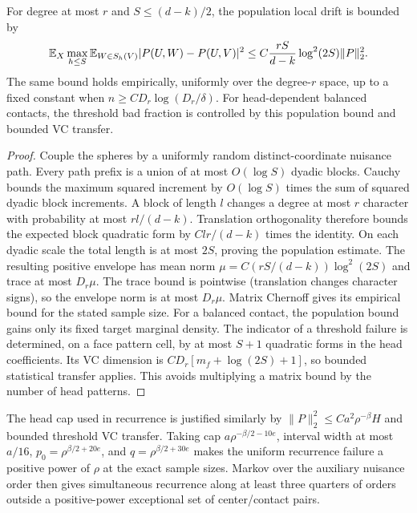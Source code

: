 \begin{lemma}\label{lem:head-drift}
For degree at most $r$ and $S\le(d-k)/2$, the population local drift is
bounded by
\[
 \mathbb E_X\max_{h\le S}\mathbb E_{W\in S_h(V)}|P(U,W)-P(U,V)|^2
 \le C\frac{rS}{d-k}\log^2(2S)\|P\|_2^2.
\]
The same bound holds empirically, uniformly over the degree-$r$ space,
up to a fixed constant when $n\ge CD_r\log(D_r/\delta)$.
For head-dependent balanced contacts, the threshold bad fraction is
controlled by this population bound and bounded VC transfer.
\end{lemma}
\begin{proof}
Couple the spheres by a uniformly random distinct-coordinate nuisance
path. Every path prefix is a union of at most $O(\log S)$ dyadic blocks.
Cauchy bounds the maximum squared increment by $O(\log S)$ times the
sum of squared dyadic block increments. A block of length $l$ changes
a degree at most $r$ character with probability at most $rl/(d-k)$.
Translation orthogonality therefore bounds the expected block quadratic
form by $Clr/(d-k)$ times the identity. On each dyadic scale the total
length is at most $2S$, proving the population estimate.
The resulting positive envelope has mean norm
$\mu=C(rS/(d-k))\log^2(2S)$ and trace at most $D_r\mu$.
The trace bound is pointwise (translation changes character signs), so
the envelope norm is at most $D_r\mu$. Matrix Chernoff gives its
empirical bound for the stated sample size.
For a balanced contact, the population bound gains only its fixed target
marginal density. The indicator of a threshold failure is determined,
on a face pattern cell, by at most $S+1$ quadratic forms in the head
coefficients. Its VC dimension is $CD_r[m_f+\log(2S)+1]$, so bounded
statistical transfer applies. This avoids multiplying a matrix bound
by the number of head patterns.
\end{proof}

The head cap used in recurrence is justified similarly by
$\|P\|_2^2\le Ca^2\rho^{-\beta}H$ and bounded threshold VC transfer.
Taking cap $a\rho^{-\beta/2-10e}$, interval width at most $a/16$,
$p_0=\rho^{\beta/2+20e}$, and $q=\rho^{\beta/2+30e}$ makes the
uniform recurrence failure a positive power of $\rho$ at the exact
sample sizes. Markov over the auxiliary nuisance order then gives
simultaneous recurrence along at least three quarters of orders outside
a positive-power exceptional set of center/contact pairs.

